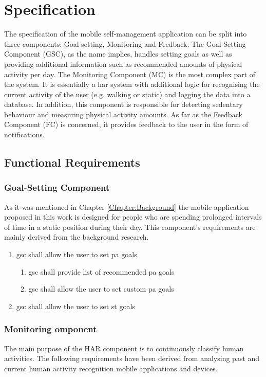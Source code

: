 \chapter{Specification}
\label{Chapter:Specification}

The specification of the mobile self-management application can be split into three components: Goal-setting, Monitoring and Feedback. The Goal-Setting Component (GSC), as the name implies, handles setting goals as well as providing additional information such as recommended amounts of physical activity per day. The Monitoring Component (MC) is the most complex part of the system. It is essentially a \gls{har} system with additional logic for recognising the current activity of the user (e.g. walking or static) and logging the data into a database. In addition, this component is responsible for detecting sedentary behaviour and measuring physical activity amounts. As far as the Feedback Component (FC) is concerned, it provides feedback to the user in the form of notifications. 
\section{Functional Requirements}

    \subsection{Goal-Setting Component}
    As it was mentioned in Chapter \ref{Chapter:Background} the mobile application proposed in this work is designed for people who are spending prolonged intervals of time in a static position during their day. This component's requirements are mainly derived from the background research. 
    
    \begin{enumerate}
        \item \gls{gsc} shall allow the user to set \gls{pa} goals
        \begin{enumerate}
            \item \gls{gsc} shall provide list of recommended \gls{pa} goals
            \item \gls{gsc} shall allow the user to set custom \gls{pa} goals
        \end{enumerate}
        \item \gls{gsc} shall allow the user to set \gls{st} goals
    \end{enumerate}
    
    
    \subsection{Monitoring omponent}
    The main purpose of the HAR component is to continuously classify human activities. The following requirements have been derived from analysing past and current human activity recognition mobile applications and devices.
    
